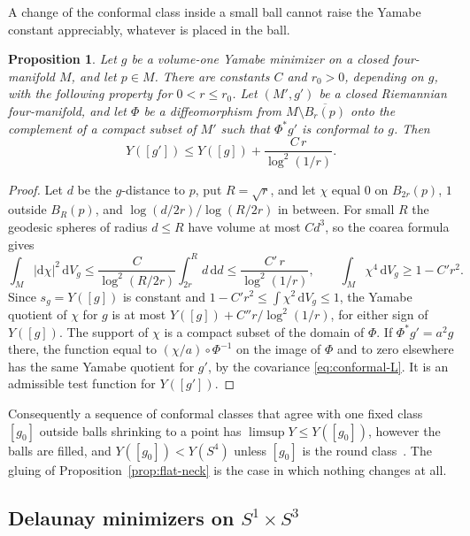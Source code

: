\documentclass[11pt]{article}
\numberwithin{equation}{section}
\newtheorem{proposition}[theorem]{Proposition}
\newcommand{\dd}{\mathrm{d}}
\newcommand{\Sphere}{S^4}
\newcommand{\abs}[1]{\lvert #1\rvert}
\newcommand{\dv}{\dd V_g}
\begin{document}
A change of the conformal class inside a small ball cannot raise the
Yamabe constant appreciably, whatever is placed in the ball.

\begin{proposition}\label{prop:small-ball}
Let \(g\) be a volume-one Yamabe minimizer on a closed four-manifold
\(M\), and let \(p\in M\). There are constants \(C\) and \(r_0>0\),
depending on \(g\), with the following property for \(0<r\le r_0\).
Let \((M',g')\) be a closed Riemannian four-manifold, and let \(\Phi\)
be a diffeomorphism from \(M\setminus\overline{B_r(p)}\) onto the
complement of a compact subset of \(M'\) such that \(\Phi^*g'\) is
conformal to \(g\). Then
\[
 Y([g'])\le Y([g])+\frac{C\,r}{\log^2(1/r)} .
\]
\end{proposition}

\begin{proof}
Let \(d\) be the \(g\)-distance to \(p\), put \(R=\sqrt r\), and let
\(\chi\) equal \(0\) on \(B_{2r}(p)\), \(1\) outside \(B_R(p)\), and
\(\log(d/2r)/\log(R/2r)\) in between. For small \(R\) the geodesic
spheres of radius \(d\le R\) have volume at most \(Cd^3\), so the
coarea formula gives
\[
 \int_M\abs{\dd\chi}^2\,\dv
 \le\frac{C}{\log^2(R/2r)}\int_{2r}^R d\,\dd d
 \le\frac{C'\,r}{\log^2(1/r)},\qquad
 \int_M\chi^4\,\dv\ge1-C'r^2 .
\]
Since \(s_g=Y([g])\) is constant and \(1-C'r^2\le\int\chi^2\,\dv\le1\),
the Yamabe quotient of \(\chi\) for \(g\) is at most
\(Y([g])+C''r/\log^2(1/r)\), for either sign of \(Y([g])\). The
support of \(\chi\) is a compact subset of the domain of \(\Phi\). If
\(\Phi^*g'=a^2g\) there, the function equal to
\((\chi/a)\circ\Phi^{-1}\) on the image of \(\Phi\) and to zero
elsewhere has the same Yamabe quotient for \(g'\), by the covariance
\eqref{eq:conformal-L}. It is an admissible test function for
\(Y([g'])\).
\end{proof}

Consequently a sequence of conformal classes that agree with one fixed
class \([g_0]\) outside balls shrinking to a point has
\(\limsup Y\le Y([g_0])\), however the balls are filled, and
\(Y([g_0])<Y(\Sphere)\) unless \([g_0]\) is the round
class~\cite{LeeParker1987Yamabe,Schoen1984Yamabe}. The gluing of
Proposition~\ref{prop:flat-neck} is the case in which nothing changes
at all.

\subsection{Delaunay minimizers on \texorpdfstring{\(S^1\times S^3\)}{S1 x S3}}
\label{sec:necklace}
\end{document}
